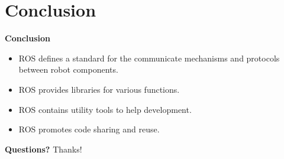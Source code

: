 \documentclass[a4paper, 11pt, conference]{ieeeconf}       %
\begin{document}
\section{Conclusion}

\textbf{Conclusion}

\begin{itemize}
  \item ROS defines a standard for the communicate mechanisms and protocols between robot components.
  \item ROS provides libraries for various functions.
  \item ROS contains utility tools to help development.
  \item ROS promotes code sharing and reuse.
\end{itemize}

\textbf{Questions?}
Thanks!


  
\end{document}
